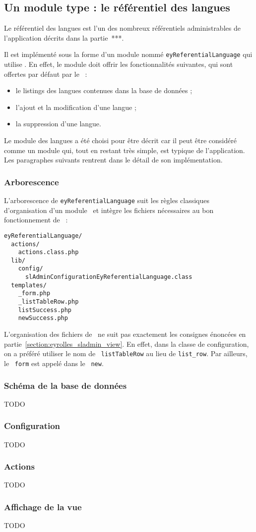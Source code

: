 \subsection{Un module type : le référentiel des langues}
\label{section:eyrolles_ref-langues}

Le référentiel des langues est l'un des nombreux référentiels administrables de l'application décrits dans la partie~***.

Il est implémenté sous la forme d'un module nommé \texttt{ey\-Referential\-Language} qui utilise \asladmin. En effet, le module doit offrir les fonctionnalités suivantes, qui sont offertes par défaut par le \aplugin\ :
\begin{itemize}
\item le listings des langues contenues dans la base de données ;
\item l'ajout et la modification d'une langue ;
\item la suppression d'une langue.
\end{itemize}

Le module des langues a été choisi pour être décrit car il peut être considéré comme un module qui, tout en restant très simple, est typique de l'application. Les paragraphes suivants rentrent dans le détail de son implémentation.


\subsubsection{Arborescence}

L'arborescence de \texttt{eyReferentialLanguage} suit les règles classiques d'organisation d'un module \asf\ et intègre les fichiers nécessaires au bon fonctionnement de \asladmin\ :

\begin{verbatim}
eyReferentialLanguage/
  actions/
    actions.class.php
  lib/
    config/
      slAdminConfigurationEyReferentialLanguage.class
  templates/
    _form.php
    _listTableRow.php
    listSuccess.php
    newSuccess.php
\end{verbatim}

L'organisation des fichiers de \atemplate\ ne suit pas exactement les consignes énoncées en partie~\ref{section:eyrolles_sladmin_view}. En effet, dans la classe de configuration, on a préféré utiliser le nom de \apartial\ \texttt{listTableRow} au lieu de \texttt{list\_row}. Par ailleurs, le \apartial\ \texttt{form} est appelé dans le \atemplate\ \texttt{new}.


\subsubsection{Schéma de la base de données}

TODO


\subsubsection{Configuration}

TODO


\subsubsection{Actions}

TODO


\subsubsection{Affichage de la vue}

TODO
